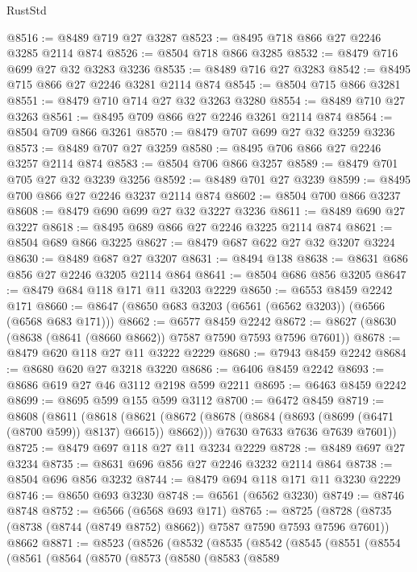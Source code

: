\begin{lexlean}{RustStd}
\begin{coremodule}
{\begin{coremodule}
{{{{{{{{{{{{{{{{{{{{{{{{{{@8516 := @8489 @719 @27 @3287
@8523 := @8495 @718 @866 @27 @2246 @3285 @2114 @874
@8526 := @8504 @718 @866 @3285
@8532 := @8479 @716 @699 @27 @32 @3283 @3236
@8535 := @8489 @716 @27 @3283
@8542 := @8495 @715 @866 @27 @2246 @3281 @2114 @874
@8545 := @8504 @715 @866 @3281
@8551 := @8479 @710 @714 @27 @32 @3263 @3280
@8554 := @8489 @710 @27 @3263
@8561 := @8495 @709 @866 @27 @2246 @3261 @2114 @874
@8564 := @8504 @709 @866 @3261
@8570 := @8479 @707 @699 @27 @32 @3259 @3236
@8573 := @8489 @707 @27 @3259
@8580 := @8495 @706 @866 @27 @2246 @3257 @2114 @874
@8583 := @8504 @706 @866 @3257
@8589 := @8479 @701 @705 @27 @32 @3239 @3256
@8592 := @8489 @701 @27 @3239
@8599 := @8495 @700 @866 @27 @2246 @3237 @2114 @874
@8602 := @8504 @700 @866 @3237
@8608 := @8479 @690 @699 @27 @32 @3227 @3236
@8611 := @8489 @690 @27 @3227
@8618 := @8495 @689 @866 @27 @2246 @3225 @2114 @874
@8621 := @8504 @689 @866 @3225
@8627 := @8479 @687 @622 @27 @32 @3207 @3224
@8630 := @8489 @687 @27 @3207
@8631 := @8494 @138
@8638 := @8631 @686 @856 @27 @2246 @3205 @2114 @864
@8641 := @8504 @686 @856 @3205
@8647 := @8479 @684 @118 @171 @11 @3203 @2229
@8650 := @6553 @8459 @2242 @171
@8660 := @8647 (@8650 @683 @3203 (@6561 (@6562 @3203)) (@6566 (@6568 @683 @171)))
@8662 := @6577 @8459 @2242
@8672 := @8627 (@8630 (@8638 (@8641 (@8660 @8662)) @7587 @7590 @7593 @7596 @7601))
@8678 := @8479 @620 @118 @27 @11 @3222 @2229
@8680 := @7943 @8459 @2242
@8684 := @8680 @620 @27 @3218 @3220
@8686 := @6406 @8459 @2242
@8693 := @8686 @619 @27 @46 @3112 @2198 @599 @2211
@8695 := @6463 @8459 @2242
@8699 := @8695 @599 @155 @599 @3112
@8700 := @6472 @8459
@8719 := @8608
    (@8611
      (@8618
        (@8621 (@8672 (@8678 (@8684 (@8693 (@8699 (@6471 (@8700 @599)) @8137) @6615)) @8662)))
        @7630
        @7633
        @7636
        @7639
        @7601))
@8725 := @8479 @697 @118 @27 @11 @3234 @2229
@8728 := @8489 @697 @27 @3234
@8735 := @8631 @696 @856 @27 @2246 @3232 @2114 @864
@8738 := @8504 @696 @856 @3232
@8744 := @8479 @694 @118 @171 @11 @3230 @2229
@8746 := @8650 @693 @3230
@8748 := @6561 (@6562 @3230)
@8749 := @8746 @8748
@8752 := @6566 (@6568 @693 @171)
@8765 := @8725
    (@8728 (@8735 (@8738 (@8744 (@8749 @8752) @8662)) @7587 @7590 @7593 @7596 @7601))
    @8662
@8871 := @8523
    (@8526
      (@8532
        (@8535
          (@8542
            (@8545
              (@8551
                (@8554
                  (@8561
                    (@8564
                      (@8570
                        (@8573
                          (@8580
                            (@8583
                              (@8589
}}}}}}}}}}}}}}}}}}}}}}}}}}
\end{coremodule}}
\end{coremodule}
\end{lexlean}
